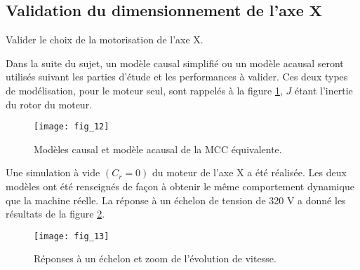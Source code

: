 \subsection{Validation du dimensionnement de l'axe $\boldsymbol{X}$}
\begin{obj}
Valider le choix de la motorisation de l'axe X.
\end{obj}


Dans la suite du sujet, un modèle causal simplifié ou un modèle acausal seront utilisés suivant les parties d'étude et les performances à valider. Ces deux types de modélisation, pour le moteur seul, sont rappelés à la figure \ref{fig:CCS_TSI_2021_fig_12}, $J$ étant l'inertie du rotor du moteur.


\begin{figure}
\centering
\texttt{[image: fig\_12]}%
\caption{\label{fig:CCS_TSI_2021_fig_12}Modèles causal et modèle acausal de la MCC équivalente.}
\end{figure}




Une simulation à vide $\left(C_{r}=0\right)$ du moteur de l'axe X a été réalisée. Les deux modèles ont été renseignés de façon à obtenir le même comportement dynamique que la machine réelle. La réponse à un échelon de tension de 320 V a donné les résultats de la figure \ref{fig:CCS_TSI_2021_fig_13}.


\begin{figure}
\centering
\texttt{[image: fig\_13]}%
\caption{\label{fig:CCS_TSI_2021_fig_13}Réponses à un échelon et zoom de l'évolution de vitesse.}
\end{figure}




